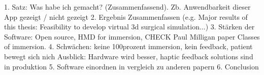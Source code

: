 1. Satz: Was habe ich gemacht? (Zusammenfassend). Zb. Anwendbarkeit dieser App gezeigt / nicht gezeigt
2. Ergebnis Zusammenfassen (e.g. Major results of this thesis: Feasibility to develop virtual 3d surgical simulation...)
3. Stärken der Software: Open source, HMD for immersion, CHECK Paul Milligan paper Classes of immersion.
4. Schwächen: keine 100prozent immersion, kein feedback, patient bewegt sich nich
            Ausblick: Hardware wird besser, haptic feedback solutions sind in produktion
5. Software einordnen in vergleich zu anderen papern
6. Conclusion
 
